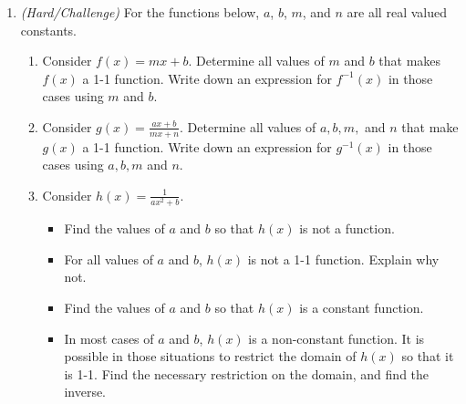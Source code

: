 \documentclass{ximera}
\begin{document}
\begin{enumerate}
\item \textit{(Hard/Challenge)} For the functions below, $a$, $b$, $m$, and $n$ are all real valued constants. 
\begin{enumerate}
\item Consider $f(x)=mx+b$. Determine all values of $m$ and $b$ that makes $f(x)$ a 1-1 function. Write down an expression for $f^{-1}(x)$ in those cases using $m$ and $b$. 
\item Consider $\displaystyle g(x)=\frac{ax+b}{mx+n}$. Determine all values of $a, b, m,$ and $n$ that make $g(x)$ a 1-1 function. Write down an expression for $g^{-1}(x)$ in those cases using $a, b, m$ and $n$.
\item Consider $h(x)=\frac{1}{ax^2+b}$. 
\begin{itemize}
\item Find the values of $a$ and $b$ so that $h(x)$ is not a function.
\item For all values of $a$ and $b$, $h(x)$ is not a 1-1 function. Explain why not.
\item Find the values of $a$ and $b$ so that $h(x)$ is a constant function. 
\item In most cases of $a$ and $b$, $h(x)$ is a non-constant function. It is possible in those situations to restrict the domain of $h(x)$ so that it is 1-1. Find the necessary restriction on the domain, and find the inverse. 
\end{itemize}  
\end{enumerate}



\end{enumerate}
\end{document}
